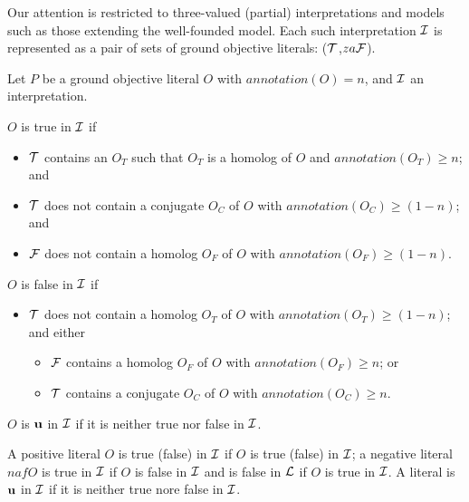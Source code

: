 Our attention is restricted to three-valued (partial) interpretations
and models such as those extending the well-founded model.  Each such
interpretation $\cI$ is represented as a pair of sets of ground
objective literals: ($\cT$,$za\cF$).


\begin{definition} \label{def:satisfiable}
Let $P$ be a ground objective literal $O$ with
$annotation(O) = n$, and $\cI$ an interpretation.

$O$ is true in $\cI$ if
\begin{itemize}
\item $\cT$ contains an $O_T$ such that $O_T$ is a homolog of
  $O$ and $annotation(O_T) \geq n$; and
\item $\cT$ does not contain a conjugate $O_C$ of $O$ with
  $annotation(O_C) \geq (1-n)$; and
\item $\cF$ does not contain a homolog $O_F$ of $O$ with
  $annotation(O_F) \geq (1-n)$.
\end{itemize}

$O$ is false in $\cI$ if 
\begin{itemize}
\item $\cT$ does not contain a homolog $O_T$ of $O$ with
  $annotation(O_T) \geq (1-n)$; and either
\begin{itemize}  
\item $\cF$ contains a homolog $O_F$ of $O$ with $annotation(O_F) \geq
  n$; or 
\item $\cT$ contains a conjugate $O_C$ of $O$ with $annotation(O_C) \geq n$.
\end{itemize}
\end{itemize}
$O$ is ${\bf u}$ in $\cI$ if it is neither true nor false in $\cI$.

A positive literal $O$ is true (false) in $\cI$ if $O$ is true (false)
in $\cI$; a negative literal $naf O$ is true in $\cI$ if $O$ is false
in $\cI$ and is false in $\cL$ if $O$ is true in $\cI$.  A literal is
${\bf u}$ in $\cI$ if it is neither true nore false in $\cI$.
\end{definition}

